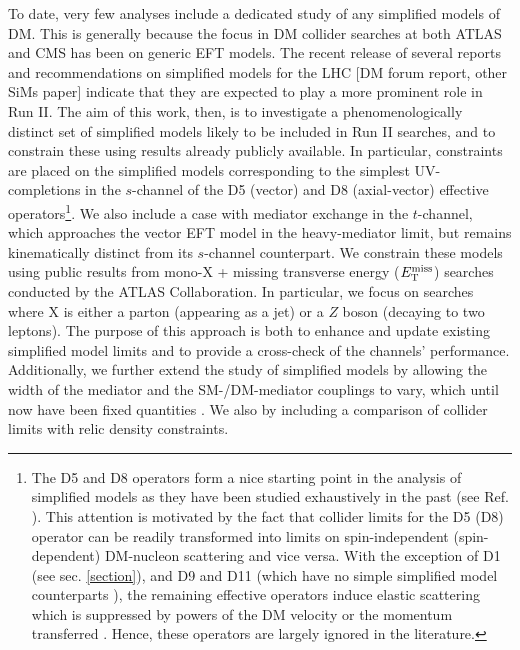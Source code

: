 To date, very few analyses include a dedicated study of any simplified models of DM. This is generally because the focus in DM collider searches at both ATLAS and CMS has been on generic EFT models. The recent release of several reports and recommendations on simplified models for the LHC $[$DM forum report, other SiMs paper$]$ indicate that they are expected to play a more prominent role in Run II. The aim of this work, then, is to investigate a phenomenologically distinct set of simplified models likely to be included in Run II searches, and to constrain these using results already publicly available. In particular, constraints are placed on the simplified models corresponding to the simplest UV-completions in the $s$-channel of the D5 (vector) and D8 (axial-vector) effective operators\footnote{The D5 and D8 operators form a nice starting point in the analysis of simplified models as they have been studied exhaustively in the past (see Ref. \cite{}). This attention is motivated by the fact that collider limits for the D5 (D8) operator can be readily transformed into limits on spin-independent (spin-dependent) DM-nucleon scattering and vice versa. With the exception of D1 (see sec. \ref{section}), and D9 and D11 (which have no simple simplified model counterparts \cite{}), the remaining effective operators induce elastic scattering which is suppressed by powers of the DM velocity or the momentum transferred \cite{Kumar}. Hence, these operators are largely ignored in the literature.}. We also include a case with mediator exchange in the $t$-channel, which approaches the vector EFT model in the heavy-mediator limit, but remains kinematically distinct from its $s$-channel counterpart.
We constrain these models using public results from mono-X + missing transverse energy ($E_{\mathrm{T}}^{\mathrm{miss}}$) searches conducted by the ATLAS Collaboration. In particular, we focus on searches where X is either a parton (appearing as a jet) or a $Z$ boson (decaying to two leptons). The purpose of this approach is both to enhance and update existing simplified model limits \cite{} and to provide a cross-check of the channels' performance. Additionally, we further extend the study of simplified models by allowing the width of the mediator and the SM-/DM-mediator couplings to vary, which until now have been fixed quantities \cite{}. We also  by including a comparison of collider limits with relic density constraints.

